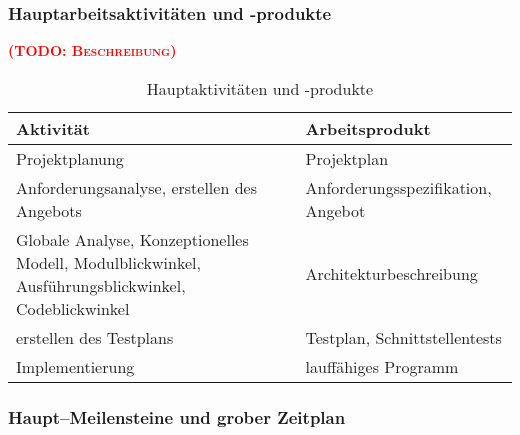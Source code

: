 \documentclass[fontsize=12pt,paper=a4,twoside]{scrartcl}
\newcommand{\todo}[1]{\textbf{\textsc{\textcolor{red}{(TODO: #1)}}}}
\begin{document}
\subsubsection{Hauptarbeitsaktivitäten und -produkte\\}
\todo{Beschreibung}
\begin{table}[htbp]
\caption{Hauptaktivitäten und -produkte}
\centering
\begin{tabular}{p{7cm}|p{7cm}}
\hline Aktivität & Arbeitsprodukt \\ 
\hline Projektplanung & Projektplan\\
\hline Anforderungsanalyse, erstellen des Angebots & Anforderungsspezifikation, Angebot\\
\hline Globale Analyse, Konzeptionelles Modell, Modulblickwinkel, Ausführungsblickwinkel, Codeblickwinkel & Architekturbeschreibung\\
\hline erstellen des Testplans & Testplan, Schnittstellentests\\
\hline Implementierung & lauffähiges Programm\\
\hline 
\end{tabular}
\end{table}

\subsubsection{Haupt--Meilensteine und grober Zeitplan}
\end{document}
